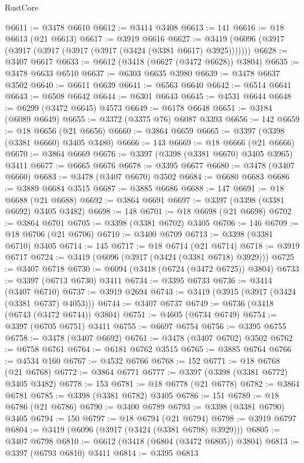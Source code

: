 \begin{lexlean}{RustCore}
\begin{coremodule}
@6611 := @3478 @6610
@6612 := @3414 @3408
@6613 := 141
@6616 := @18 @6613 (@21 @6613)
@6617 := @3919 @6616
@6627 := @3419 (@6096 (@3917 (@3917 (@3917 (@3917 (@3917 (@3424 (@3381 @6617) @3925)))))))
@6628 := @3407 @6617
@6633 := @6612 (@3418 (@6627 (@3472 @6628)) @3804)
@6635 := @3478 @6633 @6510
@6637 := @6303 @6635 @3980
@6639 := @3478 @6637 @3502
@6640 := @6611 @6639
@6641 := @6563 @6640
@6642 := @6514 @6641
@6643 := @6508 @6642
@6644 := @6301 @6643
@6645 := @4531 @6644
@6648 := @6299 (@3472 @6645) @4573
@6649 := @6178 @6648
@6651 := @3184 (@6089 @6649)
@6655 := @3372 (@3375 @76) @6087 @3393
@6656 := 142
@6659 := @18 @6656 (@21 @6656)
@6660 := @3864 @6659
@6665 := @3397 (@3398 (@3381 @6660) @3405 @3480)
@6666 := 143
@6669 := @18 @6666 (@21 @6666)
@6670 := @3864 @6669
@6676 := @3397 (@3398 (@3381 @6670) @3405 @3965) @3411
@6677 := @6665 @6676
@6678 := @3395 @6677
@6680 := @3478 (@3407 @6660)
@6683 := @3478 (@3407 @6670) @3502
@6684 := @6680 @6683
@6686 := @3889 @6684 @3515
@6687 := @3885 @6686
@6688 := 147
@6691 := @18 @6688 (@21 @6688)
@6692 := @3864 @6691
@6697 := @3397 (@3398 (@3381 @6692) @3405 @3482)
@6698 := 148
@6701 := @18 @6698 (@21 @6698)
@6702 := @3864 @6701
@6705 := @3398 (@3381 @6702) @3405
@6706 := 146
@6709 := @18 @6706 (@21 @6706)
@6710 := @3400 @6709
@6713 := @3398 (@3381 @6710) @3405
@6714 := 145
@6717 := @18 @6714 (@21 @6714)
@6718 := @3919 @6717
@6724 := @3419 (@6096 (@3917 (@3424 (@3381 @6718) @3929)))
@6725 := @3407 @6718
@6730 := @6094 (@3418 (@6724 (@3472 @6725)) @3804)
@6733 := @3397 (@6713 @6730) @3411
@6734 := @3395 @6733
@6736 := @3414 (@3407 @6710)
@6737 := @3919 @2694
@6743 := @3419 (@3915 (@3917 (@3424 (@3381 @6737) @4053)))
@6744 := @3407 @6737
@6749 := @6736 (@3418 (@6743 (@3472 @6744)) @3804)
@6751 := @4605 (@6734 @6749)
@6754 := @3397 (@6705 @6751) @3411
@6755 := @6697 @6754
@6756 := @3395 @6755
@6758 := @3478 (@3407 @6692)
@6761 := @3478 (@3407 @6702) @3502
@6762 := @6758 @6761
@6764 := @6181 @6762 @3515
@6765 := @3885 @6764
@6766 := @4534 @160
@6767 := @4532 @6766
@6768 := 152
@6771 := @18 @6768 (@21 @6768)
@6772 := @3864 @6771
@6777 := @3397 (@3398 (@3381 @6772) @3405 @3482)
@6778 := 153
@6781 := @18 @6778 (@21 @6778)
@6782 := @3864 @6781
@6785 := @3398 (@3381 @6782) @3405
@6786 := 151
@6789 := @18 @6786 (@21 @6786)
@6790 := @3400 @6789
@6793 := @3398 (@3381 @6790) @3405
@6794 := 150
@6797 := @18 @6794 (@21 @6794)
@6798 := @3919 @6797
@6804 := @3419 (@6096 (@3917 (@3424 (@3381 @6798) @3929)))
@6805 := @3407 @6798
@6810 := @6612 (@3418 (@6804 (@3472 @6805)) @3804)
@6813 := @3397 (@6793 @6810) @3411
@6814 := @3395 @6813

\end{coremodule}
\end{lexlean}
